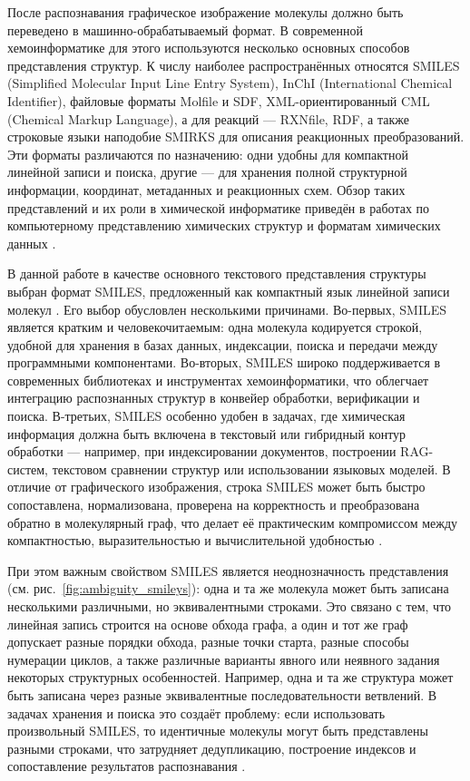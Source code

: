 После распознавания графическое изображение молекулы должно быть переведено в машинно-обрабатываемый формат. В современной хемоинформатике для этого используются несколько основных способов представления структур. К числу наиболее распространённых относятся SMILES (Simplified Molecular Input Line Entry System), InChI (International Chemical Identifier), файловые форматы Molfile и SDF, XML-ориентированный CML (Chemical Markup Language), а для реакций — RXNfile, RDF, а также строковые языки наподобие SMIRKS для описания реакционных преобразований. Эти форматы различаются по назначению: одни удобны для компактной линейной записи и поиска, другие — для хранения полной структурной информации, координат, метаданных и реакционных схем. Обзор таких представлений и их роли в химической информатике приведён в работах по компьютерному представлению химических структур и форматам химических данных \cite{refWarr,refDalby,refInChI}.

В данной работе в качестве основного текстового представления структуры выбран формат SMILES, предложенный как компактный язык линейной записи молекул \cite{refWeininger1,refWeininger2}. Его выбор обусловлен несколькими причинами. Во-первых, SMILES является кратким и человекочитаемым: одна молекула кодируется строкой, удобной для хранения в базах данных, индексации, поиска и передачи между программными компонентами. Во-вторых, SMILES широко поддерживается в современных библиотеках и инструментах хемоинформатики, что облегчает интеграцию распознанных структур в конвейер обработки, верификации и поиска. В-третьих, SMILES особенно удобен в задачах, где химическая информация должна быть включена в текстовый или гибридный контур обработки — например, при индексировании документов, построении RAG-систем, текстовом сравнении структур или использовании языковых моделей. В отличие от графического изображения, строка SMILES может быть быстро сопоставлена, нормализована, проверена на корректность и преобразована обратно в молекулярный граф, что делает её практическим компромиссом между компактностью, выразительностью и вычислительной удобностью \cite{refWeininger1,refWarr}.

При этом важным свойством SMILES является неоднозначность представления (см. рис.~\ref{fig:ambiguity_smileys}): одна и та же молекула может быть записана несколькими различными, но эквивалентными строками. Это связано с тем, что линейная запись строится на основе обхода графа, а один и тот же граф допускает разные порядки обхода, разные точки старта, разные способы нумерации циклов, а также различные варианты явного или неявного задания некоторых структурных особенностей. Например, одна и та же структура может быть записана через разные эквивалентные последовательности ветвлений. В задачах хранения и поиска это создаёт проблему: если использовать произвольный SMILES, то идентичные молекулы могут быть представлены разными строками, что затрудняет дедупликацию, построение индексов и сопоставление результатов распознавания \cite{refWeininger2}.

